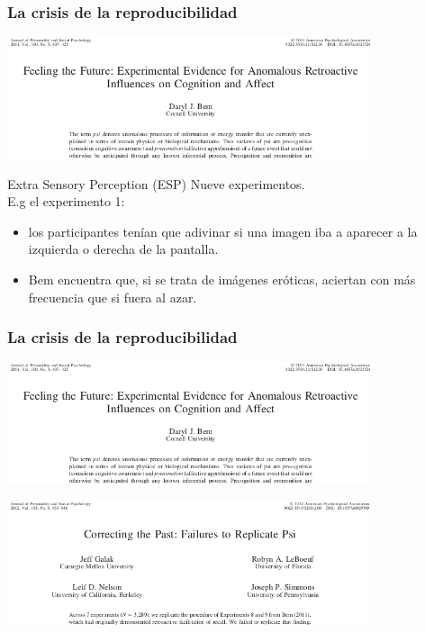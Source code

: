 \documentclass[9pt]{beamer}
\begin{document}
\begin{frame}
  \frametitle{La crisis de la reproducibilidad}
  \begin{overlayarea}{\textwidth}{\textheight}
  \begin{center}
    \includegraphics[width=0.8\textwidth]{images/bem}
  \end{center}
  \begin{block}{Extra Sensory Perception (ESP)}
    Nueve experimentos. \\
    E.g el experimento 1:
    \begin{itemize}
    \item<3-> los participantes
tenían que adivinar si una imagen iba a aparecer a la izquierda o
derecha de la pantalla.
    
\item<4-> Bem encuentra que, si se trata de imágenes eróticas,
  aciertan con más frecuencia que si fuera al azar. 
    \end{itemize}
    
  \end{block}
\end{overlayarea}  

\end{frame}


\begin{frame}
  \frametitle{La crisis de la reproducibilidad}
  \begin{overlayarea}{\textwidth}{\textheight}
  \begin{center}
    \includegraphics[width=0.8\textwidth]{images/bem}
  \end{center}
\begin{center}
    \includegraphics[width=0.8\textwidth]{images/failure_to_replicate_bem}
  \end{center}
\end{overlayarea}
\end{frame}
\end{document}
